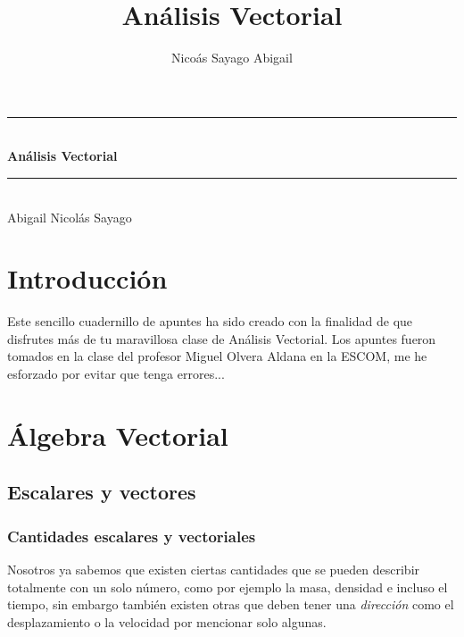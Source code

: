 \documentclass[12pt,openany]{book}
\title{An\'alisis Vectorial}
\author{Nico\'as Sayago Abigail}
\begin{document}
    \begin{titlepage}
        \centering
        \rule{\linewidth}{0.5mm} \\[1.0cm]
            { \huge \bfseries An\'alisis Vectorial}\\[1.0cm] 
        \rule{\linewidth}{0.5mm} \\[2.0cm]
        \centering
        Abigail Nicol\'as Sayago 
    \end{titlepage}
   

\tableofcontents

\chapter*{Introducci\'on}
 
	Este sencillo cuadernillo de apuntes ha sido creado con la finalidad de que disfrutes m\'as 
	de tu maravillosa clase de Análisis Vectorial. Los apuntes fueron tomados en la clase del 
	profesor Miguel Olvera Aldana en la ESCOM, me he esforzado por evitar que tenga errores...


\chapter{\'Algebra Vectorial}

	\section{Escalares y vectores}
	    
	    \subsection{Cantidades escalares y vectoriales}
	    Nosotros ya sabemos que existen ciertas cantidades que se pueden describir 
	    totalmente con un solo n\'umero, como por ejemplo la masa, densidad e incluso 
	    el tiempo, sin embargo tambi\'en existen otras que deben tener una 
	    \textsl{direcci\'on} como el desplazamiento o la velocidad por
	     mencionar solo algunas.
	    
\end{document}
